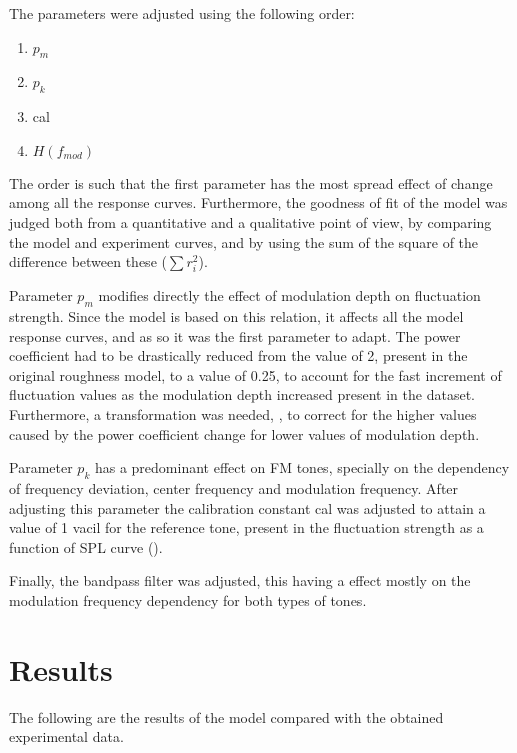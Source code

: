 \documentclass[../main.tex]{subfiles}
\begin{document}
\begin{modelchapter}
The parameters were adjusted using the following order:
\begin{enumerate}
  \item $p_m$
  \item $p_k$
  \item cal
  \item $H(f_{mod})$
\end{enumerate}

The order is such that the first parameter has the most spread effect of change
among all the response curves. Furthermore, the goodness of fit of the model was
judged both from a quantitative and a qualitative point of view, by comparing
the model and experiment curves, and by using the sum of the square of the
difference between these ($\sum r_i^2$).

Parameter $p_m$ modifies directly the effect of modulation depth on fluctuation
strength. Since the model is based on this relation, it affects all the model
response curves, and as so it was the first parameter to adapt. The power
coefficient had to be drastically reduced from the value of 2, present in the
original roughness model, to a value of 0.25, to account for the fast increment
of fluctuation values as the modulation depth increased present in the dataset.
Furthermore, a transformation was needed,
, to correct for the higher
values caused by the power coefficient change for lower values of
modulation depth.

Parameter $p_k$ has a predominant effect on \gls{FM} tones, specially on the
dependency of frequency deviation, center frequency and modulation frequency.
After adjusting this parameter the calibration constant cal was adjusted to
attain a value of 1 vacil for the reference tone, present in the fluctuation
strength as a function of \gls{SPL} curve ().

Finally, the bandpass filter was adjusted, this having a effect mostly on the
modulation frequency dependency for both types of tones.

\section{Results}

The following are the results of the model compared with the obtained
experimental data.



\end{modelchapter}
\end{document}
